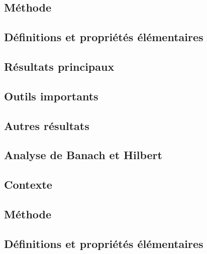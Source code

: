 \documentclass[11pt,a4paper]{article}
\begin{document}
\subsection*{Méthode}

\subsection*{Définitions et propriétés élémentaires}

\subsection*{Résultats principaux}

\subsection*{Outils importants}

\subsection*{Autres résultats}


\newpage
\begin{center}  
\section*{Analyse de Banach et Hilbert} 
\end{center}



\subsection*{Contexte}

\subsection*{Méthode}

\subsection*{Définitions et propriétés élémentaires}
\end{document}
